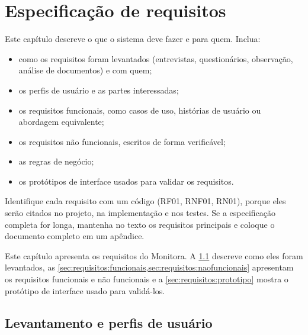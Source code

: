 \chapter{Especificação de requisitos}
\label{cap:requisitos}

\begin{instrucao}
Este capítulo descreve o que o sistema deve fazer e para quem. Inclua:
\begin{itemize}
  \item como os requisitos foram levantados (entrevistas, questionários,
        observação, análise de documentos) e com quem;
  \item os perfis de usuário e as partes interessadas;
  \item os requisitos funcionais, como casos de uso, histórias de usuário ou
        abordagem equivalente;
  \item os requisitos não funcionais, escritos de forma verificável;
  \item as regras de negócio;
  \item os protótipos de interface usados para validar os requisitos.
\end{itemize}
Identifique cada requisito com um código (RF01, RNF01, RN01), porque eles
serão citados no projeto, na implementação e nos testes. Se a especificação
completa for longa, mantenha no texto os requisitos principais e coloque o
documento completo em um apêndice.
\end{instrucao}

Este capítulo apresenta os requisitos do Monitora. A
\cref{sec:requisitos:levantamento} descreve como eles foram levantados, as
\cref{sec:requisitos:funcionais,sec:requisitos:naofuncionais} apresentam os
requisitos funcionais e não funcionais e a \cref{sec:requisitos:prototipo}
mostra o protótipo de interface usado para validá-los.

\section{Levantamento e perfis de usuário}
\label{sec:requisitos:levantamento}

